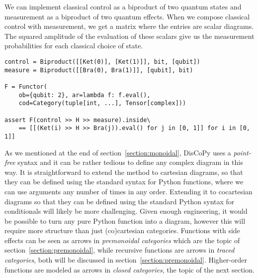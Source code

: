 \begin{example}\label{example:biproduct-measurement}
We can implement classical control as a biproduct of two quantum states and measurement as a biproduct of two quantum effects.
When we compose classical control with measurement, we get a matrix where the entries are scalar diagrams.
The squared amplitude of the evaluation of these scalars give us the measurement probabilities for each classical choice of state.

\begin{verbatim}
control = Biproduct([[Ket(0)], [Ket(1)]], bit, [qubit])
measure = Biproduct([[Bra(0), Bra(1)]], [qubit], bit)

F = Functor(
    ob={qubit: 2}, ar=lambda f: f.eval(),
    cod=Category(tuple[int, ...], Tensor[complex]))

assert F(control >> H >> measure).inside\
    == [[(Ket(i) >> H >> Bra(j)).eval() for j in [0, 1]] for i in [0, 1]]
\end{verbatim}
\end{example}

As we mentioned at the end of section~\ref{section:monoidal}, DisCoPy uses a \emph{point-free} syntax and it can be rather tedious to define any complex diagram in this way.
It is straightforward to extend the \py{diagramize} method to cartesian diagrams, so that they can be defined using the standard syntax for Python functions, where we can use arguments any number of times in any order.
Extending it to cocartesian diagrams so that they can be defined using the standard Python syntax for conditionals will likely be more challenging.
Given enough engineering, it would be possible to turn any pure Python function into a diagram, however this will require more structure than just (co)cartesian categories.
Functions with side effects can be seen as arrows in \emph{premonoidal categories} which are the topic of section~\ref{section:premonoidal}, while recursive functions are arrows in \emph{traced categories}, both will be discussed in section~\ref{section:premonoidal}.
Higher-order functions are modeled as arrows in \emph{closed categories}, the topic of the next section.
